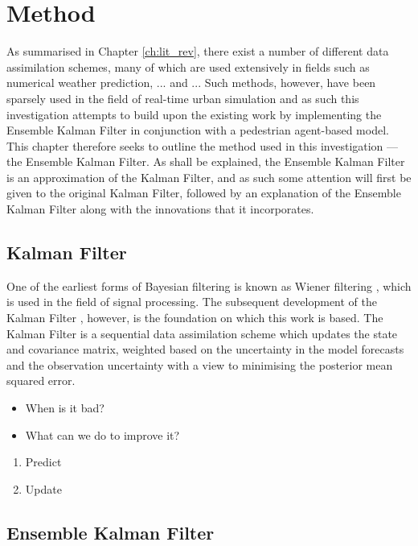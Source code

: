 \chapter{Method}\label{ch:method}

As summarised in Chapter \ref{ch:lit_rev}, there exist a number of different
data assimilation schemes, many of which are used extensively in fields such as
numerical weather prediction, ... and ...
Such methods, however, have been sparsely used in the field of real-time urban
simulation and as such this investigation attempts to build upon the existing
work by implementing the Ensemble Kalman Filter in conjunction with a pedestrian
agent-based model.
This chapter therefore seeks to outline the method used in this investigation --- the
Ensemble Kalman Filter. 
As shall be explained, the Ensemble Kalman Filter is an approximation of the
Kalman Filter, and as such some attention will first be given to the original
Kalman Filter, followed by an explanation of the Ensemble Kalman Filter along
with the innovations that it incorporates.

\section{Kalman Filter}\label{sec:method:kf}

One of the earliest forms of Bayesian filtering is known as Wiener filtering
\citep{wiener1950extrapolation}, which is used in the field of signal
processing.
The subsequent development of the Kalman Filter \citep{kalman1960new,
kalman1961new}, however, is the foundation on which this work is based.
The Kalman Filter is a sequential data assimilation scheme which updates the
state and covariance matrix, weighted based on the uncertainty in the model
forecasts and the observation uncertainty with a view to minimising the
posterior mean squared error.

\begin{itemize}
    \item When is it bad?
    \item What can we do to improve it?
\end{itemize}

\begin{enumerate}
    \item Predict
    \item Update
\end{enumerate}

\section{Ensemble Kalman Filter}\label{sec:method:enkf}

